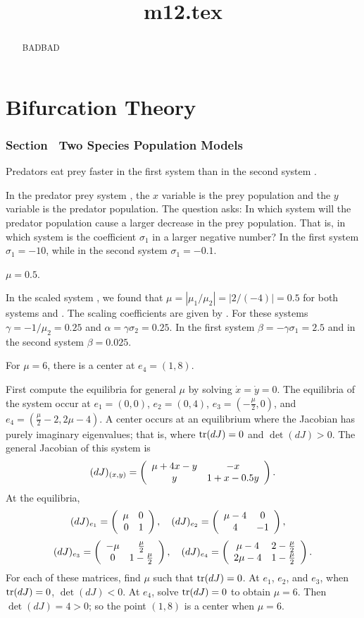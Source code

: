 \documentclass{ximera}
\title{m12.tex}
\begin{document}
\begin{abstract}
BADBAD
\end{abstract}
\maketitle

\chapter{Bifurcation Theory}

\subsection*{Section~\protect{\ref{S:TSPM}} Two Species Population Models}


\ans Predators eat prey faster in the first system  than in 
the second system .

\soln  In the predator prey system , the $x$ variable is the
prey population and the $y$ variable is the predator population.  The
question asks: In which system will the predator population cause a
larger decrease in the prey population.  That is, in which system is
the coefficient $\sigma_1$ in  a larger negative number?  In
the first system $\sigma_1=-10$, while in the second system $\sigma_1=-0.1$.

   \ans  $\mu = 0.5$.

\soln  In the scaled system , we found that
$\mu=|\mu_1/\mu_2|= |2/(-4)|=0.5$ for both systems  and 
.  The scaling coefficients are given by . 
For these systems $\gamma=-1/\mu_2=0.25$ and
$\alpha=\gamma\sigma_2=0.25$.  In the first system
$\beta=-\gamma\sigma_1= 2.5$ and in the second system $\beta=0.025$.

\ans For $\mu = 6$, there is a center at $e_4 = (1,8)$.

\soln First compute the equilibria for general $\mu$ by solving
$\dot{x} = \dot{y} = 0$.  The equilibria of the system occur at
$e_1 = (0,0)$, $e_2 = (0,4)$, $e_3 = (-\frac{\mu}{2},0)$, and
$e_4 = (\frac{\mu}{2} - 2, 2\mu - 4)$.  A center occurs at an equilibrium
where the Jacobian has purely imaginary eigenvalues; that is, where
${\rm tr}{(dJ)} = 0$ and $\det{(dJ)} > 0$.  The general Jacobian of this
system is
\[
(dJ)_{(x,y)} = \left(\begin{array}{cc} \mu + 4x - y & -x\\ y &1 + x - 0.5y\end{array}\right).
\]
At the equilibria,
\[
(dJ)_{e_1} = \left(\begin{array}{rr} \mu & 0\\ 0 &1\end{array}\right), \quad
(dJ)_{e_2} = \left(\begin{array}{cc} \mu - 4 & 0\\ 4 &-1\end{array}\right), \quad
\]
\[
(dJ)_{e_3} = \left(\begin{array}{cc} -\mu & \frac{\mu}{2}\\ 0 &1 - \frac{\mu}{2}\end{array}\right), \quad
(dJ)_{e_4} = \left(\begin{array}{cc} \mu - 4 & 2 - \frac{\mu}{2}\\ 2\mu - 4 &1 -
\frac{\mu}{2}\end{array}\right).
\]
For each of these matrices, find $\mu$ such that ${\rm tr}{(dJ)} = 0$.  At
$e_1$, $e_2$, and $e_3$, when ${\rm tr}{(dJ)} = 0$, $\det{(dJ)} < 0$.
At $e_4$, solve ${\rm tr}(dJ) = 0$ to obtain $\mu = 6$.  Then $\det{(dJ)}
= 4 > 0$; so the point $(1,8)$ is a center when $\mu = 6$.
\end{document}
